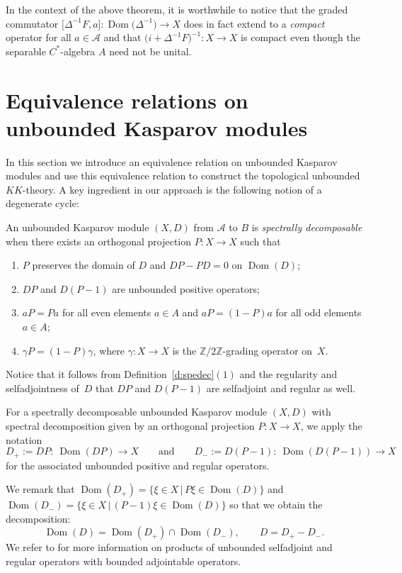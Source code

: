 \documentclass[pdftex]{sigma}
\numberwithin{equation}{section}
\newcommand{\zz}{\mathbb{Z}}
\newcommand{\ga}{\gamma}
\newcommand{\De}{\Delta}
\newcommand{\s}[1]{\mathscr{#1}}
\begin{document}
In the context of the above theorem, it is worthwhile to notice that the graded commutator $\big[\De^{-1} F,a\big]\colon \operatorname{Dom}\big(\De^{-1}\big) \to X$ does in fact extend to a \emph{compact} operator for all $a \in \s A$ and that $\big(i + \De^{-1} F\big)^{-1}\colon X \to X$ is compact even though the separable $C^*$-algebra $A$ need not be unital.

\section{Equivalence relations on unbounded Kasparov modules}
In this section we introduce an equivalence relation on unbounded Kasparov modules and use this equivalence relation to construct the topological unbounded $KK$-theory. A key ingredient in our approach is the following notion of a degenerate cycle:

\begin{dfn}\label{d:spedec}
An unbounded Kasparov module $(X,D)$ from $\s A$ to $B$ is \emph{spectrally decomposable} when there exists an orthogonal projection $P \colon X \to X$ such that
\begin{enumerate}\itemsep=0pt
\item[1)] $P$ preserves the domain of $D$ and $D P - P D = 0$ on $\operatorname{Dom}(D)$;
\item[2)] $D P$ and $D (P - 1)$ are unbounded positive operators;
\item[3)] $a P = P a$ for all even elements $a \in A$ and $a P = (1 - P) a$ for all odd elements $a \in A$;
\item[4)] $\ga P = (1 - P) \ga$, where $\ga\colon X \to X$ is the $\zz/2\zz$-grading operator on~$X$.
\end{enumerate}
\end{dfn}

Notice that it follows from Definition~\ref{d:spedec}$(1)$ and the regularity and selfadjointness of~$D$ that $DP$ and $D(P-1)$ are selfadjoint and regular as well.

For a spectrally decomposable unbounded Kasparov module $(X,D)$ with spectral decomposition given by an orthogonal projection $P\colon X \to X$, we apply the notation
\[
D_+ := DP \colon \ \operatorname{Dom}(DP) \to X \qquad \text{and} \qquad D_- := D(P - 1)\colon \ \operatorname{Dom}(D(P-1)) \to X
\]
for the associated unbounded positive and regular operators. %

We remark that $\operatorname{Dom}(D_+) = \{ \xi \in X \,|\, P \xi \in \operatorname{Dom}(D) \}$ and $\operatorname{Dom}(D_-) = \{ \xi \in X \,|\, (P - 1) \xi \in \operatorname{Dom}(D) \}$ so that we obtain the decomposition:
\[
\operatorname{Dom}(D) = \operatorname{Dom}(D_+) \cap \operatorname{Dom}(D_-), \qquad D = D_+ - D_- .
\]
We refer to \cite[Section~6]{Kaa:DAH} for more information on products of unbounded selfadjoint and regular operators with bounded adjointable operators.
\end{document}
